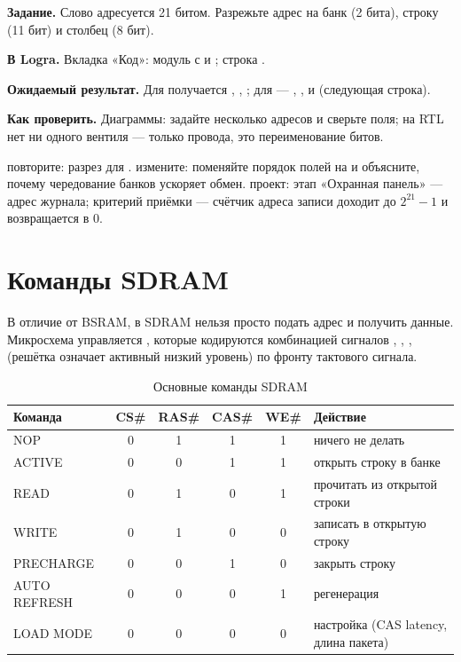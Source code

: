 \begin{diybox}
\textbf{Задание.} Слово адресуется 21 битом. Разрежьте адрес на банк (2 бита), строку (11 бит) и столбец (8 бит).

\textbf{В Logra.} Вкладка «Код»: модуль с  и ; строка .

\textbf{Ожидаемый результат.} Для  получается , , ; для  --- , ,  и  (следующая строка).

\textbf{Как проверить.} Диаграммы: задайте несколько адресов и сверьте поля; на RTL нет ни одного вентиля --- только провода, это переименование битов.

 повторите: разрез для .  измените: поменяйте порядок полей на  и объясните, почему чередование банков ускоряет обмен.  проект: этап «Охранная панель» --- адрес журнала; критерий приёмки --- счётчик адреса записи доходит до $2^{21}-1$ и возвращается в 0.
\end{diybox}

\section{Команды SDRAM}

В отличие от BSRAM, в SDRAM нельзя просто подать адрес и получить данные.
Микросхема управляется , которые кодируются комбинацией
сигналов , , ,  (решётка
означает активный низкий уровень) по фронту тактового сигнала.

\begin{table}[H]
\centering
\caption{Основные команды SDRAM}
\begin{tabular}{l c c c c l}
\toprule
\textbf{Команда} & \textbf{CS\#} & \textbf{RAS\#} & \textbf{CAS\#} & \textbf{WE\#} & \textbf{Действие} \\
\midrule
NOP        & 0 & 1 & 1 & 1 & ничего не делать \\
ACTIVE     & 0 & 0 & 1 & 1 & открыть строку в банке \\
READ       & 0 & 1 & 0 & 1 & прочитать из открытой строки \\
WRITE      & 0 & 1 & 0 & 0 & записать в открытую строку \\
PRECHARGE  & 0 & 0 & 1 & 0 & закрыть строку \\
AUTO REFRESH & 0 & 0 & 0 & 1 & регенерация \\
LOAD MODE  & 0 & 0 & 0 & 0 & настройка (CAS latency, длина пакета) \\
\bottomrule
\end{tabular}
\end{table}

